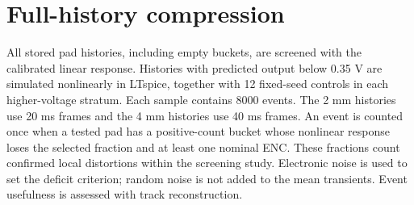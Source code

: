 \documentclass[10pt,a4paper]{article}
\begin{document}
\section{Full-history compression}
All stored pad histories, including empty buckets, are screened with the
calibrated linear response. Histories with predicted output below 0.35 V are
simulated nonlinearly in LTspice, together with 12 fixed-seed controls in each
higher-voltage stratum. Each sample contains 8000 events. The 2 mm histories
use 20 ms frames and the 4 mm histories use 40 ms frames.
An event is counted once when a tested pad has a positive-count bucket whose
nonlinear response loses the selected fraction and at least one nominal ENC.
These fractions count confirmed local distortions within the screening study.
Electronic noise is used to set the deficit criterion; random noise is not
added to the mean transients. Event usefulness is assessed with track reconstruction.
\end{document}
